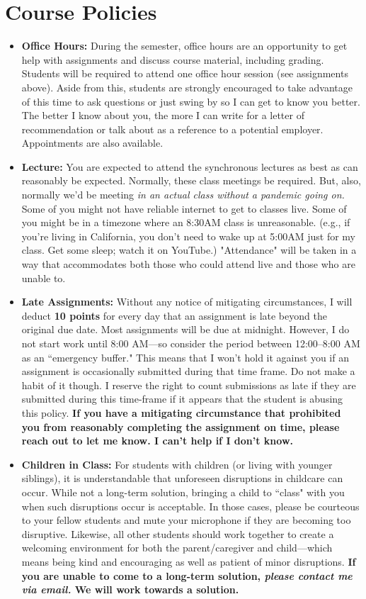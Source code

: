 \documentclass[11pt]{article}
\begin{document}
\section{Course Policies}
\begin{itemize}
	\item \textbf{Office Hours:} During the semester, office hours are an opportunity to get help with assignments and discuss course material, including grading. Students will be required to attend one office hour session (see assignments above). Aside from this, students are strongly encouraged to take advantage of this time to ask questions or just swing by so I can get to know you better. The better I know about you, the more I can write for a letter of recommendation or talk about as a reference to a potential employer. Appointments are also available.
	\item \textbf{Lecture:} You are expected to attend the synchronous lectures as best as can reasonably be expected. Normally, these class meetings be required. But, also, normally we'd be meeting \textit{in an actual class without a pandemic going on.} Some of you might not have reliable internet to get to classes live. Some of you might be in a timezone where an 8:30AM class is unreasonable. (e.g., if you're living in California, you don't need to wake up at 5:00AM just for my class. Get some sleep; watch it on YouTube.) "Attendance" will be taken in a way that accommodates both those who could attend live and those who are unable to.
	\item \textbf{Late Assignments:} Without any notice of mitigating circumstances, I will deduct \textbf{10 points} for every day that an assignment is late beyond the original due date. Most assignments will be due at midnight. However, I do not start work until 8:00 AM---so consider the period between 12:00--8:00 AM as an ``emergency buffer." This means that I won't hold it against you if an assignment is occasionally submitted during that time frame. Do not make a habit of it though. I reserve the right to count submissions as late if they are submitted during this time-frame if it appears that the student is abusing this policy. \textbf{If you have a mitigating circumstance that prohibited you from reasonably completing the assignment on time, please reach out to let me know. I can't help if I don't know.} 
	\item \textbf{Children in Class:} For students with children (or living with younger siblings), it is understandable that unforeseen disruptions in childcare can occur. While not a long-term solution, bringing a child to ``class" with you when such disruptions occur is acceptable. In those cases, please be courteous to your fellow students and mute your microphone if they are becoming too disruptive. Likewise, all other students should work together to create a welcoming environment for both the parent/caregiver and child---which means being kind and encouraging as well as patient of minor disruptions. \textbf{If you are unable to come to a long-term solution, \textit{please contact me via email.} We will work towards a solution.}

\end{itemize}
\end{document}

